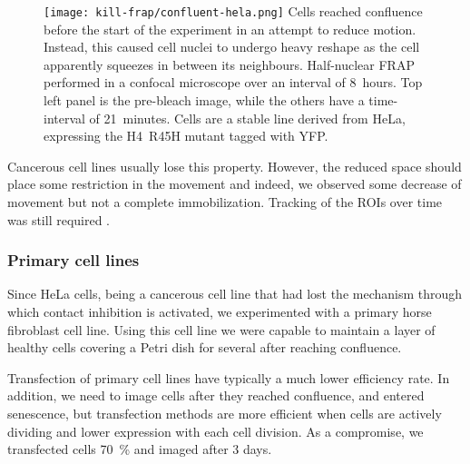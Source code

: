       \begin{figure}
        \centering
        \texttt{[image: kill-frap/confluent-hela.png]}
          {
            Cells reached confluence before the start of the
            experiment in an attempt to reduce motion. Instead, this caused
            cell nuclei to undergo heavy reshape as the cell apparently
            squeezes in between its neighbours. Half-nuclear FRAP performed in
            a confocal microscope over an interval of 8~hours. Top left panel
            is the pre-bleach image, while the others have a time-interval of
            21~minutes. Cells are a stable line derived from HeLa, expressing
            the H4~R45H mutant tagged with YFP.
          }
        \label{fig:kill-frap:confluent-hela}
      \end{figure}

      Cancerous cell lines usually lose this property. However, the reduced
      space should place some restriction in the movement and indeed, we
      observed some decrease of movement but not a complete immobilization.
      Tracking of the ROIs over time was still required .

    \subsubsection{Primary cell lines}

      Since HeLa cells, being a cancerous cell line that had lost
      the mechanism through which contact
      inhibition is activated, we experimented with a primary horse
      fibroblast cell line. Using this cell line we were capable to maintain
      a layer of healthy cells covering a Petri dish for several after
      reaching confluence.

      Transfection of primary cell lines have typically a much lower
      efficiency rate. In addition, we need to image cells after they
      reached confluence, and entered senescence, but transfection
      methods are more efficient when cells are actively dividing
      and lower expression with each cell division. As a compromise,
      we transfected cells \SI{70}{\percent} and imaged after 3 days.

